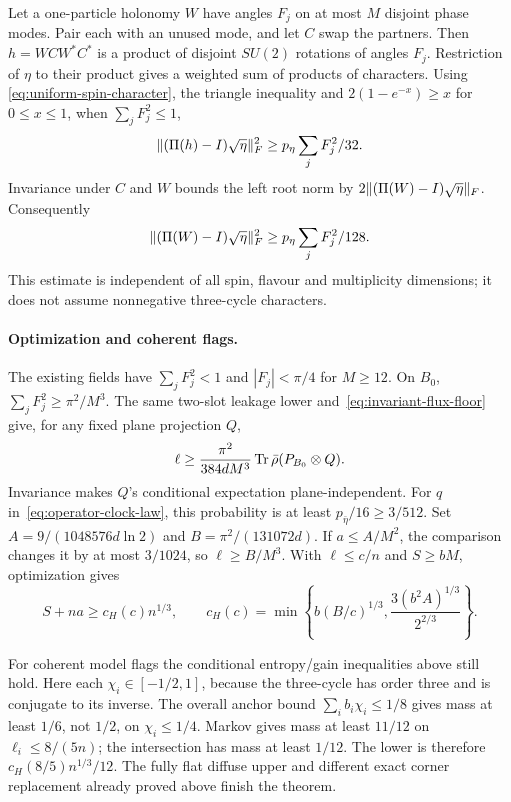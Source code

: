 Let a one-particle holonomy $W$ have angles $F_j$ on at most $M$
disjoint phase modes. Pair each with an unused mode, and let $C$ swap
the partners. Then $h=WCW^*C^*$ is a product of disjoint $SU(2)$
rotations of angles $F_j$. Restriction of $\eta$ to their product gives
a weighted sum of products of characters. Using
\eqref{eq:uniform-spin-character}, the triangle inequality and
$2(1-e^{-x})\geq x$ for $0\leq x\leq1$, when $\sum_jF_j^2\leq1$,
\[
 \lVert (\Pi(h)-I)\sqrt\eta\rVert_F^2
        \geq p_\eta\sum_jF_j^2/32.
\]
Invariance under $C$ and $W$ bounds the left root norm by
$2\lVert (\Pi(W)-I)\sqrt\eta\rVert_F$. Consequently
\begin{equation}\label{eq:invariant-flux-floor}
 \lVert (\Pi(W)-I)\sqrt\eta\rVert_F^2
        \geq p_\eta\sum_jF_j^2/128.
\end{equation}
This estimate is independent of all spin, flavour and multiplicity
dimensions; it does not assume nonnegative three-cycle characters.

\paragraph{Optimization and coherent flags.}
The existing fields have $\sum_jF_j^2<1$ and $|F_j|<\pi/4$
for $M\geq12$. On $B_0$, $\sum_jF_j^2\geq\pi^2/M^3$.
The same two-slot leakage lower and~\eqref{eq:invariant-flux-floor}
give, for any fixed plane projection $Q$,
\[
 \ell\geq\frac{\pi^2}{384dM^3}
                 \operatorname{Tr}\bar\rho(P_{B_0}\otimes Q).
\]
Invariance makes $Q$'s conditional expectation plane-independent.
For $q$ in~\eqref{eq:operator-clock-law}, this probability is at least
$p_{\bar\eta}/16\geq3/512$.
Set $A=9/(1048576d\ln2)$ and $B=\pi^2/(131072d)$.
If $a\leq A/M^2$, the comparison changes it by at most $3/1024$,
so $\ell\geq B/M^3$.
With $\ell\leq c/n$ and $S\geq bM$, optimization gives
\[
 S+na\geq c_H(c)n^{1/3},\qquad
 c_H(c)=\min\left\{b(B/c)^{1/3},
                   \frac{3(b^2A)^{1/3}}{2^{2/3}}\right\}.
\]

For coherent model flags the conditional entropy/gain inequalities
above still hold. Here each $\chi_i\in[-1/2,1]$, because the
three-cycle has order three and is conjugate to its inverse.
The overall anchor bound $\sum_ib_i\chi_i\leq1/8$ gives mass
at least $1/6$, not $1/2$, on $\chi_i\leq1/4$.
Markov gives mass at least $11/12$ on $\ell_i\leq8/(5n)$;
the intersection has mass at least $1/12$.
The lower is therefore $c_H(8/5)n^{1/3}/12$.
The fully flat diffuse upper and different exact corner replacement
already proved above finish the theorem.

